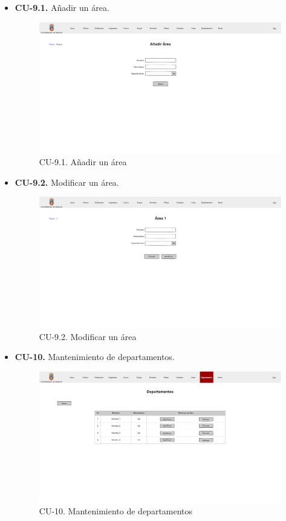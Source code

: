 \begin{itemize}
	\item \textbf{CU-9.1.} Añadir un área.
	\begin{figure}[!h]
		\centering
		\includegraphics[width=\textwidth]{../img/Anexos/Vistas/add_area.png}
		\caption{CU-9.1. Añadir un área}\label{fig:../img/Anexos/Vistas/add_area.png}
	\end{figure}
	
	\item \textbf{CU-9.2.} Modificar un área.
	\begin{figure}[!h]
		\centering
		\includegraphics[width=\textwidth]{../img/Anexos/Vistas/mod_area.png}
		\caption{CU-9.2. Modificar un área}\label{fig:../img/Anexos/Vistas/mod_area.png}
	\end{figure}
	
	\item \textbf{CU-10.} Mantenimiento de departamentos.
	\begin{figure}[!h]
		\centering
		\includegraphics[width=\textwidth]{../img/Anexos/Vistas/departamentos.png}
		\caption{CU-10. Mantenimiento de departamentos}\label{fig:../img/Anexos/Vistas/departamentos.png}
	\end{figure}
	

\end{itemize}
